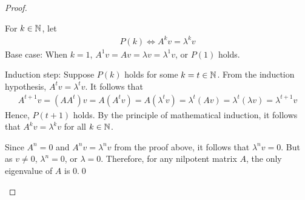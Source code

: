 \begin{proof}
\begin{enumerate}[(i)]
        For $k\in\mathbb N$, let 
        \[
            \begin{aligned}
                P(k)\iff A^kv=\lambda^kv
            \end{aligned}
        \]
        Base case: When $k=1$, $A^1v=Av=\lambda v=\lambda^1v$, or $P(1)$ holds.
        
        Induction step: Suppose $P(k)$ holds for some $k=t\in\mathbb N$.
        From the induction hypothesis, $A^tv=\lambda^tv$.
        It follows that 
        \[
            \begin{aligned}
                A^{t+1}v=(AA^t)v=A(A^{t}v)=A(\lambda^tv)=\lambda^t(Av)=\lambda^t(\lambda v)=\lambda^{t+1}v
            \end{aligned}
        \]
        Hence, $P(t+1)$ holds. By the principle of mathematical induction, it follows that $A^kv=\lambda^kv$ for all $k\in\mathbb N$.
        
        Since $A^n=0$ and $A^nv=\lambda^nv$ from the proof above, it follows that $\lambda^nv=0$.
        But as $v\not=0$, $\lambda^n=0$, or $\lambda=0$.
        Therefore, for any nilpotent matrix $A$, the only eigenvalue of $A$ is 0.\qed
    \end{enumerate}
    \renewcommand{\qedsymbol}{}
\end{proof}